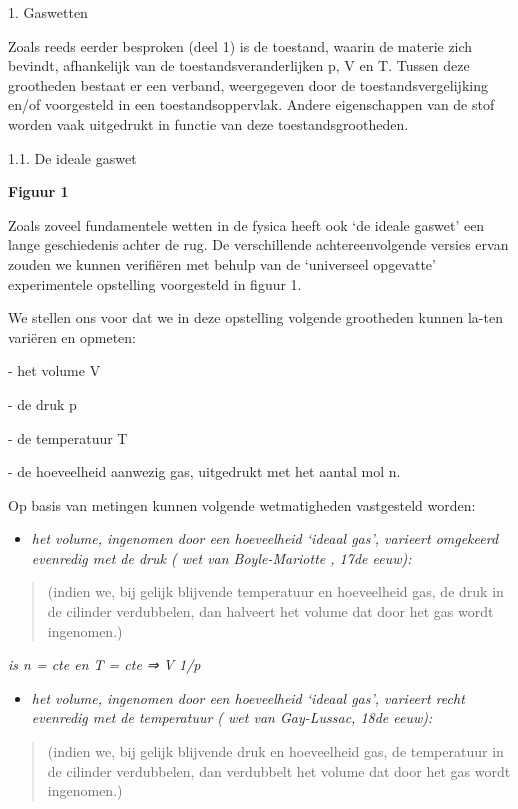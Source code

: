\documentclass[]{article}
\date{}
\begin{document}
1. Gaswetten

Zoals reeds eerder besproken (deel 1) is de toestand, waarin de materie
zich bevindt, afhankelijk van de toestandsveranderlijken p, V en T.
Tussen deze grootheden bestaat er een verband, weergegeven door de
toestandsvergelijking en/of voorgesteld in een toestandsoppervlak.
Andere eigenschappen van de stof worden vaak uitgedrukt in functie van
deze toestandsgrootheden.

1.1. De ideale gaswet

\textbf{Figuur 1}

Zoals zoveel fundamentele wetten in de fysica heeft ook `de ideale
gaswet' een lange geschiedenis achter de rug. De verschillende
achtereenvolgende versies ervan zouden we kunnen verifiëren met behulp
van de `universeel opgevatte' experimentele opstelling voorgesteld in
figuur 1.

We stellen ons voor dat we in deze opstelling volgende grootheden kunnen
la-ten variëren en opmeten:

- het volume V

- de druk p

- de temperatuur T

- de hoeveelheid aanwezig gas, uitgedrukt met het aantal mol n.

Op basis van metingen kunnen volgende wetmatigheden vastgesteld worden:

\begin{itemize}
\item
  \emph{het volume, ingenomen door een hoeveelheid `ideaal gas',
  varieert omgekeerd evenredig met de druk ( wet van Boyle-Mariotte ,
  17de eeuw):}
\end{itemize}

\begin{quote}
(indien we, bij gelijk blijvende temperatuur en hoeveelheid gas, de druk
in de cilinder verdubbelen, dan halveert het volume dat door het gas
wordt ingenomen.)
\end{quote}

\emph{is n = cte en T = cte ⇒ V 1/p}

\begin{itemize}
\item
  \emph{het volume, ingenomen door een hoeveelheid `ideaal gas',
  varieert recht evenredig met de temperatuur ( wet van Gay-Lussac, 18de
  eeuw):}
\end{itemize}

\begin{quote}
(indien we, bij gelijk blijvende druk en hoeveelheid gas, de temperatuur
in de cilinder verdubbelen, dan verdubbelt het volume dat door het gas
wordt ingenomen.)
\end{quote}
\end{document}

